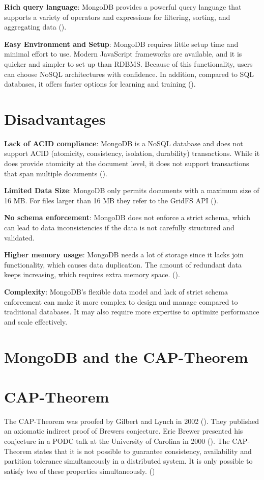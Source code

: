\textbf{Rich query language}: MongoDB provides a powerful query language that supports a variety of operators and expressions for filtering, sorting, and aggregating data (\cite{mongodb-query}).

\textbf{Easy Environment and Setup}: MongoDB requires little setup time and minimal effort to use. Modern JavaScript frameworks are available, and it is quicker and simpler to set up than RDBMS.
Because of this functionality, users can choose NoSQL architectures with confidence. In addition, compared to SQL databases, it offers faster options for learning and training (\cites{knowledgenile-pro-con}{jamsheer_2019}). 

\section{Disadvantages}
\textbf{Lack of ACID compliance}: MongoDB is a NoSQL database and does not support ACID (atomicity, consistency, isolation, durability) transactions. While it does provide atomicity at the document level, it does not support transactions that span multiple documents (\cites{mongodb-transactions}{knowledgenile-pro-con}).

\textbf{Limited Data Size}: MongoDB only permits documents with a maximum size of 16 MB. For files larger than 16 MB they refer to the GridFS API (\cite{mongodb-documents}).

\textbf{No schema enforcement}: MongoDB does not enforce a strict schema, which can lead to data inconsistencies if the data is not carefully structured and validated.

\textbf{Higher memory usage}: MongoDB needs a lot of storage since it lacks join functionality, which causes data duplication. The amount of redundant data keeps increasing, which requires extra memory space. (\cite{knowledgenile-pro-con}).

\textbf{Complexity}: MongoDB's flexible data model and lack of strict schema enforcement can make it more complex to design and manage compared to traditional databases. It may also require more expertise to optimize performance and scale effectively.

\pagebreak
\section{MongoDB and the CAP-Theorem}
\section*{CAP-Theorem}
The \acs{CAP}-Theorem was proofed by Gilbert and Lynch in 2002 (\cite{brewer:2002}). They published an axiomatic indirect proof of Brewers conjecture. Eric Brewer presented his conjecture in a \acs{PODC} talk at the University of Carolina in 2000 (\cite{brewer:2000}). The \acs{CAP}-Theorem states that it is not possible to guarantee consistency, availability and partition tolerance simultaneously in a distributed system. It is only possible to satisfy two of these properties simultaneously. (\cite[p.~1]{brewer:2002})
